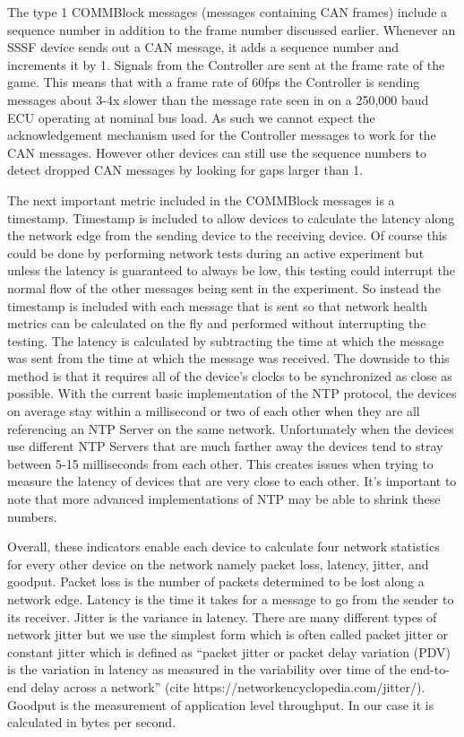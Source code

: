 \documentclass[letterpaper,twocolumn,12pt]{article}
\begin{document}
The type 1 COMMBlock messages (messages containing CAN frames) include a sequence number in addition to the frame number discussed earlier. Whenever an SSSF device sends out a CAN message, it adds a sequence number and increments it by 1. Signals from the Controller are sent at the frame rate of the game. This means that with a frame rate of 60fps the Controller is sending messages about 3-4x slower than the message rate seen in on a 250,000 baud ECU operating at nominal bus load. As such we cannot expect the acknowledgement mechanism used for the Controller messages to work for the CAN messages. However other devices can still use the sequence numbers to detect dropped CAN messages by looking for gaps larger than 1.

The next important metric included in the COMMBlock messages is a timestamp. Timestamp is included to allow devices to calculate the latency along the network edge from the sending device to the receiving device. Of course this could be done by performing network tests during an active experiment but unless the latency is guaranteed to always be low, this testing could interrupt the normal flow of the other messages being sent in the experiment. So instead the timestamp is included with each message that is sent so that network health metrics can be calculated on the fly and performed without interrupting the testing. The latency is calculated by subtracting the time at which the message was sent from the time at which the message was received. The downside to this method is that it requires all of the device's clocks to be synchronized as close as possible. With the current basic implementation of the NTP protocol, the devices on average stay within a millisecond or two of each other when they are all referencing an NTP Server on the same network. Unfortunately when the devices use different NTP Servers that are much farther away the devices tend to stray between 5-15 milliseconds from each other. This creates issues when trying to measure the latency of devices that are very close to each other. It's important to note that more advanced implementations of NTP may be able to shrink these numbers.

Overall, these indicators enable each device to calculate four network statistics for every other device on the network namely packet loss, latency, jitter, and goodput. Packet loss is the number of packets determined to be lost along a network edge. Latency is the time it takes for a message to go from the sender to its receiver. Jitter is the variance in latency. There are many different types of network jitter but we use the simplest form which is often called packet jitter or constant jitter which is defined as “packet jitter or packet delay variation (PDV) is the variation in latency as measured in the variability over time of the end-to-end delay across a network” (cite https://networkencyclopedia.com/jitter/). Goodput is the measurement of application level throughput. In our case it is calculated in bytes per second.
\end{document}
